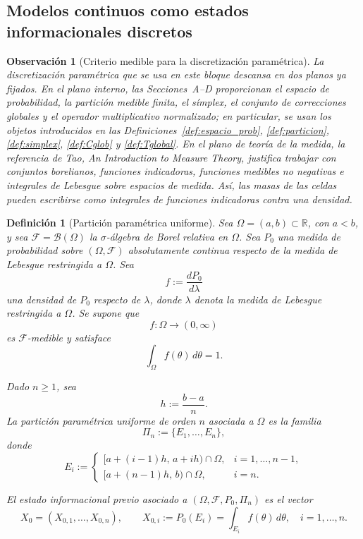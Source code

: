 ﻿\documentclass[12pt]{article}
\newtheorem{definicion}{Definición}[section]
\newtheorem{observacion}{Observación}[section]
\begin{document}
\subsection{Modelos continuos como estados informacionales discretos}

\begin{observacion}[Criterio medible para la discretización paramétrica]
La discretización paramétrica que se usa en este bloque descansa en dos planos ya fijados. En el plano interno, las Secciones~A--D proporcionan el espacio de probabilidad, la partición medible finita, el símplex, el conjunto de correcciones globales y el operador multiplicativo normalizado; en particular, se usan los objetos introducidos en las Definiciones~\ref{def:espacio_prob}, \ref{def:particion}, \ref{def:simplex}, \ref{def:Cglob} y \ref{def:Tglobal}. En el plano de teoría de la medida, la referencia de Tao, \emph{An Introduction to Measure Theory}, justifica trabajar con conjuntos borelianos, funciones indicadoras, funciones medibles no negativas e integrales de Lebesgue sobre espacios de medida. Así, las masas de las celdas pueden escribirse como integrales de funciones indicadoras contra una densidad.
\end{observacion}

\begin{definicion}[Partición paramétrica uniforme]\label{def:particion_parametrica}
Sea $\Omega=(a,b)\subset\mathbb R$, con $a<b$, y sea $\mathcal F=\mathcal B(\Omega)$ la $\sigma$-álgebra de Borel relativa en $\Omega$. Sea $P_0$ una medida de probabilidad sobre $(\Omega,\mathcal F)$ absolutamente continua respecto de la medida de Lebesgue restringida a $\Omega$. Sea
\[
f:=\frac{dP_0}{d\lambda}
\]
una densidad de $P_0$ respecto de $\lambda$, donde $\lambda$ denota la medida de Lebesgue restringida a $\Omega$. Se supone que
\[
f:\Omega\to(0,\infty)
\]
es $\mathcal F$-medible y satisface
\[
\int_\Omega f(\theta)\,d\theta=1.
\]

Dado $n\ge 1$, sea
\[
h:=\frac{b-a}{n}.
\]
La \emph{partición paramétrica uniforme} de orden $n$ asociada a $\Omega$ es la familia
\[
\Pi_n:=\{E_1,\dots,E_n\},
\]
donde
\[
E_i:=
\begin{cases}
[a+(i-1)h,\,a+ih)\cap\Omega, & i=1,\dots,n-1,\\[4pt]
[a+(n-1)h,\,b)\cap\Omega, & i=n.
\end{cases}
\]

El \emph{estado informacional previo} asociado a $(\Omega,\mathcal F,P_0,\Pi_n)$ es el vector
\[
X_0=(X_{0,1},\dots,X_{0,n}),
\qquad
X_{0,i}:=P_0(E_i)=\int_{E_i} f(\theta)\,d\theta,
\quad i=1,\dots,n.
\]
\end{definicion}
\end{document}
